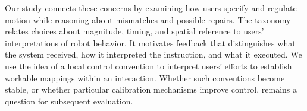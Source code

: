 Our study connects these concerns by examining how users specify and regulate motion while reasoning about mismatches and possible repairs. The taxonomy relates choices about magnitude, timing, and spatial reference to users' interpretations of robot behavior. It motivates feedback that distinguishes what the system received, how it interpreted the instruction, and what it executed. We use the idea of a local control convention to interpret users' efforts to establish workable mappings within an interaction. Whether such conventions become stable, or whether particular calibration mechanisms improve control, remains a question for subsequent evaluation.
